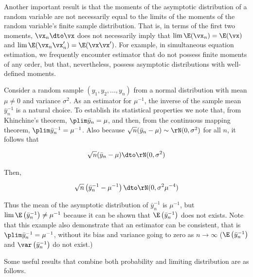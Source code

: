 Another important result is that the moments of the asymptotic distribution of a random variable are not necessarily equal to the limits of the moments of the random variable's finite sample distribution. That is, in terms of the first two moments, $\vx_n\dto \vx$ does not necessarily imply that $\lim \E(\vx_n) = \E(\vx)$ and $\lim \E(\vx_n\vx_n') = \E(\vx\vx')$. For example, in simultaneous equation estimation, we frequently encounter estimator that do not possess finite moments of any order, but that, nevertheless, possess asymptotic distributions with well-defined moments.

\begin{example}
Consider a random sample $(y_1, y_2,...,y_n)$ from a normal distribution with mean $\mu \neq 0$ and variance $\sigma^2$. As an estimator for $\mu^{-1}$, the inverse of the sample mean $\bar{y}_n^{-1}$ is a natural choice. To establish its statistical properties we note that, from Khinchine's theorem, $\plim \bar{y}_n = \mu$, and then, from the continuous mapping theorem, $\plim \bar{y}_n^{-1} = \mu^{-1}$. Also because $\sqrt{n}(\bar{y}_n - \mu)\sim \rN(0, \sigma^2)$ for all $n$, it follows that

\begin{equation*}
  \sqrt{n}(\bar{y}_n - \mu)\dto \rN(0, \sigma^2)
\end{equation*}

Then, 

\begin{equation*}
  \sqrt{n}\left(\bar{y}_n^{-1} - \mu^{-1}\right)\dto \rN(0, \sigma^2\mu^{-4})
\end{equation*}

Thus the mean of the asymptotic distribution of $\bar{y}_n^{-1}$ is $\mu^{-1}$, but $\lim \E\left(\bar{y}_n^{-1}\right)\neq \mu^{-1}$ because it can be shown that $\E\left(\bar{y}_n^{-1}\right)$ does not exists. Note that this example also demonstrate that an estimator can be consistent, that is $\plim \bar{y}_n^{-1} = \mu^{-1}$, without its bias and variance going to zero as $n\to\infty$ ($\E\left(\bar{y}_n^{-1}\right)$ and $\var\left(\bar{y}_n^{-1}\right)$ do not exist.)
\end{example}

Some useful results that combine both probability and limiting distribution are as follows.

